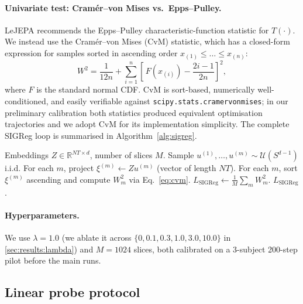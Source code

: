\paragraph{Univariate test: Cram\'er--von Mises vs.\ Epps--Pulley.}
LeJEPA recommends the Epps--Pulley characteristic-function statistic for
$T(\cdot)$. We instead use the Cram\'er--von Mises (CvM) statistic, which
has a closed-form expression for samples sorted in ascending order
$x_{(1)} \le \dots \le x_{(n)}$:
\begin{equation}
  W^2 = \frac{1}{12n}
        + \sum_{i=1}^{n}\!\left[\,F(x_{(i)}) - \frac{2i-1}{2n}\right]^2,
  \label{eq:cvm}
\end{equation}
where $F$ is the standard normal CDF. CvM is sort-based, numerically
well-conditioned, and easily verifiable against
\texttt{scipy.stats.cramervonmises}; in our preliminary calibration both
statistics produced equivalent optimisation trajectories and we adopt CvM
for its implementation simplicity. The complete SIGReg loop is summarised
in Algorithm~\ref{alg:sigreg}.

\begin{algorithm}[t]
\caption{SIGReg loss with CvM univariate statistic.}
\label{alg:sigreg}
\begin{algorithmic}[1]
\REQUIRE Embeddings $Z \in \mathbb{R}^{NT \times d}$, number of slices $M$.
\STATE Sample $u^{(1)}, \dots, u^{(m)} \sim \mathcal{U}(S^{d-1})$ i.i.d.
\STATE For each $m$, project $\xi^{(m)} \gets Z u^{(m)}$ (vector of length $NT$).
\STATE For each $m$, sort $\xi^{(m)}$ ascending and compute $W^2_m$ via
       Eq.~\eqref{eq:cvm}.
\STATE $L_\text{SIGReg} \gets \tfrac{1}{M}\sum_m W^2_m$.
\RETURN $L_\text{SIGReg}$.
\end{algorithmic}
\end{algorithm}

\paragraph{Hyperparameters.}
We use $\lambda = 1.0$ (we ablate it across $\{0, 0.1, 0.3, 1.0, 3.0,
10.0\}$ in \cref{sec:results:lambda}) and $M = 1024$ slices, both calibrated
on a 3-subject 200-step pilot before the main runs.

\subsection{Linear probe protocol}
\label{sec:method:probe}

